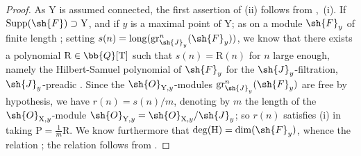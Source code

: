 \begin{proof}
As $\mathrm{Y}$ is assumed connected, the first assertion of (ii) follows from ,~(i). If $\operatorname{Supp}(\sh{F})\supset\mathrm{Y}$, and if $y$ is a maximal point of $\mathrm{Y}$; as on a module $\sh{F}_y$ of finite length ; setting $s(n)=\operatorname{long}(\operatorname{gr}^n_{\sh{J}_y}(\sh{F}_y))$, we know that there exists a polynomial $\mathrm{R}\in\bb{Q}[\mathrm{T}]$ such that $s(n)=\mathrm{R}(n)$ for $n$ large enough, namely the Hilbert-Samuel polynomial of $\sh{F}_y$ for the $\sh{J}_y$-filtration, $\sh{J}_y$-preadic . Since the $\sh{O}_{\mathrm{Y},y}$-modules $\operatorname{gr}^n_{\sh{J}_y}(\sh{F}_y)$ are free by hypothesis, we have $r(n)=s(n)/m$, denoting by $m$ the length of the $\sh{O}_{\mathrm{X},y}$-module $\sh{O}_{\mathrm{Y},y}=\sh{O}_{\mathrm{X},y}/\sh{J}_y$; so $r(n)$ satisfies (i) in taking $\mathrm{P}=\frac{1}{m}\mathrm{R}$. We know furthermore  that $\deg(\mathrm{H})=\dim(\sh{F}_y)$, whence the relation ; the relation  follows from .


\end{proof}
